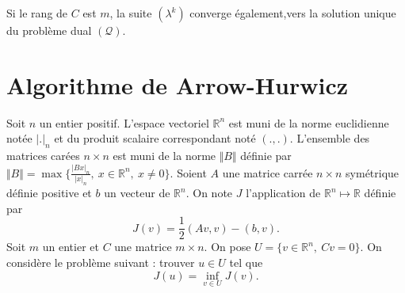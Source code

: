 \documentclass[11pt, a4paper]{article}
\begin{document}
Si le rang de $C$ est $m$, la suite $(\lambda^k)$ converge également,vers la solution unique du problème dual $(\mathcal{Q})$.
 
%
\section*{Algorithme de Arrow-Hurwicz}
%
Soit $n$ un entier positif. L'espace vectoriel $\mathbb{R}^n$ est muni de la norme euclidienne notée $\vert .\vert_n$ et du produit scalaire correspondant noté $(.,.)$. L'ensemble des matrices carées $n \times n$ est muni de la norme $\Vert B \Vert$ définie par $\Vert B \Vert = \max{\lbrace \frac{\vert Bx\vert_n}{\vert x\vert_n}, ~x \in \mathbb{R}^n, ~x\neq 0 \rbrace}$. Soient $A$ une matrice carrée $n\times n$ symétrique définie positive et $b$ un vecteur de $\mathbb{R}^n$. On note $J$ l'application de $\mathbb{R}^n \mapsto \mathbb{R}$ définie par 
\begin{equation}
J(v) = \frac{1}{2} (Av,v) - (b,v).
\end{equation}
Soit $m$ un entier et $C$ une matrice $m\times n$. On pose $U=\lbrace v \in \mathbb{R}^n, ~ Cv = 0\rbrace$. On considère le problème suivant : trouver $u \in U$ tel que
\begin{equation}
\displaystyle J(u) = \inf_{v \in U} J(v).
\label{eq:prob}
\end{equation}
\end{document}
